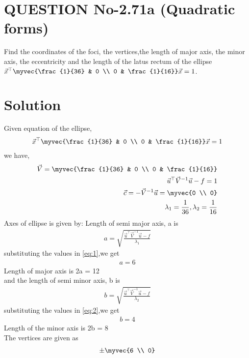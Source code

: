 \documentclass[journal,12pt,twocolumn]{IEEEtran}
\begin{document}
\section{QUESTION No-2.71a (Quadratic forms)}
 Find the coordinates of the foci, the vertices,the length of major axis, the minor axis, the eccentricity and the length of the latus
rectum of the ellipse $\vec{x}^{\top}\myvec{\frac{1}{36} & 0 \\ 0 & \frac{1}{16}}\vec{x} = 1$.
%
\section{Solution}
Given equation of the ellipse,
\begin{align}
  \vec{x}^{\top}\myvec{\frac{1}{36} & 0 \\ 0 & \frac{1}{16}}\vec{x} = 1
\end{align}
we have,
\begin{align}
    \vec{V} = \myvec{\frac{1}{36} & 0 \\ 0 & \frac{1}{16}}
    \\
    \vec{u}^{\top}\vec{V}^{-1}\vec{u}-f = 1
    \\
    \vec{c} = -\vec{V}^{-1}\vec{u}=\myvec{0 \\ 0}
    \\
    \lambda_1 = \frac{1}{36} , \lambda_2 = \frac{1}{16}
\end{align}
Axes of ellipse is given by:
Length of semi major axis, a is
\begin{align}
  a = \sqrt{\frac{\vec{u}^{\top}\vec{V}^{-1}\vec{u}-f}{\lambda_1}} \label{eq:1}
 \end{align}
 substituting the values in \eqref{eq:1},we get
 \begin{align}
    a = 6 
 \end{align}
Length of major axis is 2a = 12
\\
 and the length of semi minor axis, b is
  \begin{align}
    b = \sqrt{\frac{\vec{u}^{\top}\vec{V}^{-1}\vec{u}-f}{\lambda_2}} \label{eq:2}
 \end{align}
 substituting the values in \eqref{eq:2},we get
 \begin{align}
    b = 4 
\end{align}
 Length of the minor axis is 2b = 8
\\
The vertices are given as
\begin{align}
    \pm\myvec{6 \\ 0} 
\end{align}
\end{document}
